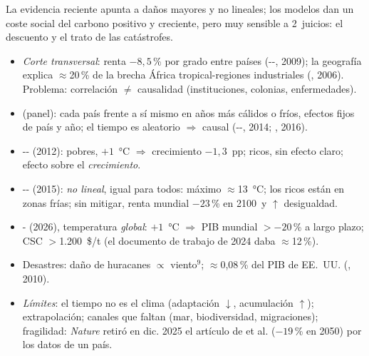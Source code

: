 \documentclass{article}
\begin{document}
\begin{columnas}
\begin{ideaclave}
La evidencia reciente apunta a daños mayores y no lineales; los modelos dan un coste social del carbono positivo y creciente, pero muy sensible a 2~juicios: el descuento y el trato de las catástrofes.
\end{ideaclave}

\begin{itemize}
\item \emph{Corte transversal}: renta $-8{,}5$\,\% por grado entre países (--, 2009); la geografía explica $\approx$20\,\% de la brecha África tropical-regiones industriales (, 2006). Problema: correlación $\neq$ causalidad (instituciones, colonias, enfermedades).
\item {} (panel): cada país frente a sí mismo en años más cálidos o fríos, efectos fijos de país y año; el tiempo es aleatorio $\Rightarrow$ causal (--, 2014; , 2016).
\item {}-- (2012): pobres, $+1$~°C $\Rightarrow$ crecimiento $-1{,}3$~pp; ricos, sin efecto claro; efecto sobre el \emph{crecimiento}.
\item {}-- (2015): \emph{no lineal}, igual para todos: máximo $\approx$13~°C; los ricos están en zonas frías; sin mitigar, renta mundial $-23$\,\% en 2100~y $\uparrow$ desigualdad.
\end{itemize}
\begin{itemize}
\item {}- (2026), temperatura \emph{global}: $+1$~°C $\Rightarrow$ PIB mundial $>-20$\,\% a largo plazo; CSC $>$1.200~\$/t (el documento de trabajo de 2024 daba $\approx$12\,\%).
\item Desastres: daño de huracanes $\propto$ viento$^9$; $\approx$0,08\,\% del PIB de EE.~UU. (, 2010).
\item \emph{Límites}: el tiempo no es el clima (adaptación $\downarrow$, acumulación $\uparrow$); extrapolación; canales que faltan (mar, biodiversidad, migraciones); fragilidad: \emph{Nature} retiró en dic. 2025 el artículo de  et al. ($-19$\,\% en 2050) por los datos de un país.
\end{itemize}


\end{columnas}
\end{document}
